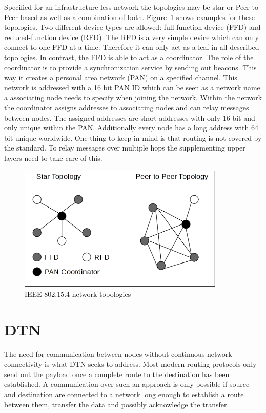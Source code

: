 Specified for an infrastructure-less network the topologies may be star or
Peer-to-Peer based as well as a combination of both. Figure~\ref{fig:802154topologies}
shows examples for these topologies. Two different device types are allowed:
full-function device (FFD) and reduced-function device (RFD). The RFD is a very
simple device which can only connect to one FFD at a time. Therefore it can only
act as a leaf in all described topologies. In contrast, the FFD is able to act
as a coordinator. The role of the coordinator is to provide a synchronization
service by sending out beacons. This way it creates a personal area network
(PAN) on a specified channel. This network is addressed with a 16 bit PAN ID
which can be seen as a network name a associating node needs to specify when
joining the network. Within the network the coordinator assigns
addresses to associating nodes and can relay messages between nodes. The
assigned addresses are short addresses with only 16 bit and only unique within
the PAN. Additionally every node has a long address with 64 bit unique worldwide.
One thing to keep in mind is that routing is not covered by the standard. To
relay messages over multiple hops the supplementing upper layers need to take
care of this.

\begin{figure}
  \begin{center}
    \includegraphics[height=6cm]{images/802154topology}
    \caption{IEEE 802.15.4 network topologies}
        \label{fig:802154topologies}
  \end{center}
\end{figure}

\section{DTN}
\label{introdtn}
The need for communication between nodes without continuous network
connectivity is what DTN seeks to address. Most modern routing protocols only
send out the payload once a complete route to the destination has been established.
A communication over such an approach is only possible if source and destination
are connected to a network long enough to establish a route between them,
transfer the data and possibly acknowledge the transfer.

